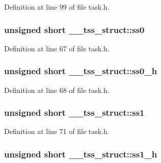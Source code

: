 Definition at line 99 of file task.\+h.

\subsubsection[{\texorpdfstring{ss0}{ss0}}]{\setlength{\rightskip}{0pt plus 5cm}unsigned short \+\_\+\+\_\+tss\+\_\+struct\+::ss0}\hypertarget{struct____tss__struct_a64d13cf91ec122ec8ed42917b9dd471b}{}\label{struct____tss__struct_a64d13cf91ec122ec8ed42917b9dd471b}


Definition at line 67 of file task.\+h.

\subsubsection[{\texorpdfstring{ss0\+\_\+h}{ss0_h}}]{\setlength{\rightskip}{0pt plus 5cm}unsigned short \+\_\+\+\_\+tss\+\_\+struct\+::ss0\+\_\+h}\hypertarget{struct____tss__struct_a06f3d0a7a04074ed8772d8ee810c9a38}{}\label{struct____tss__struct_a06f3d0a7a04074ed8772d8ee810c9a38}


Definition at line 68 of file task.\+h.

\subsubsection[{\texorpdfstring{ss1}{ss1}}]{\setlength{\rightskip}{0pt plus 5cm}unsigned short \+\_\+\+\_\+tss\+\_\+struct\+::ss1}\hypertarget{struct____tss__struct_a1c405de895c4eb4ffe2930361aa252d3}{}\label{struct____tss__struct_a1c405de895c4eb4ffe2930361aa252d3}


Definition at line 71 of file task.\+h.

\subsubsection[{\texorpdfstring{ss1\+\_\+h}{ss1_h}}]{\setlength{\rightskip}{0pt plus 5cm}unsigned short \+\_\+\+\_\+tss\+\_\+struct\+::ss1\+\_\+h}\hypertarget{struct____tss__struct_a3bbb779909ca09f2003bf80d78f62cbe}{}\label{struct____tss__struct_a3bbb779909ca09f2003bf80d78f62cbe}


